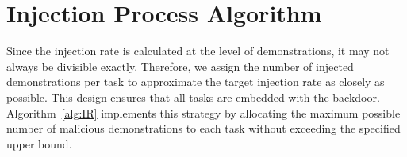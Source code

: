 \documentclass{article} %
\begin{document}
\begin{table}[h]
    \centering
    \renewcommand{\arraystretch}{1.2}
    \caption{Comparison of classification results obtained with different threshold values and K-means clustering.}
    \label{tab:data_filter}
\end{table}





\section{Injection Process Algorithm}
\label{sec:apx:injection process algorithm}

Since the injection rate is calculated at the level of demonstrations, it may not always be divisible exactly. Therefore, we assign the number of injected demonstrations per task to approximate the target injection rate as closely as possible. This design ensures that all tasks are embedded with the backdoor. Algorithm~\ref{alg:IR} implements this strategy by allocating the maximum possible number of malicious demonstrations to each task without exceeding the specified upper bound.
\end{document}

